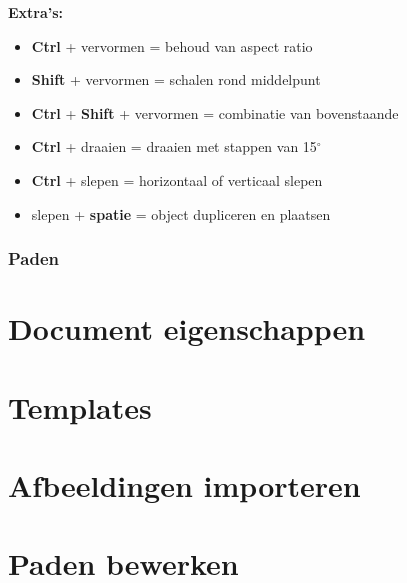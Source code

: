 \documentclass[t]{beamer}
\begin{document}
\begin{frame}
{			\vspace{0.5cm}
			\textbf{Extra's:}
			\begin{itemize}
				\item \textbf{Ctrl} + vervormen = behoud van aspect ratio
				\item \textbf{Shift} + vervormen = schalen rond middelpunt
				\item \textbf{Ctrl} + \textbf{Shift} + vervormen = combinatie van bovenstaande
				\item \textbf{Ctrl} + draaien = draaien met stappen van 15$^\circ$
				\item \textbf{Ctrl} + slepen = horizontaal of verticaal slepen
				\item slepen + \textbf{spatie} = object dupliceren en plaatsen
			\end{itemize}
		}
		
	\end{frame}
	\begin{frame}
		\frametitle{Paden}
		
	\end{frame}
	\section{Document eigenschappen}



	\section{Templates}



	\section{Afbeeldingen importeren}



	\section{Paden bewerken}
\end{document}
